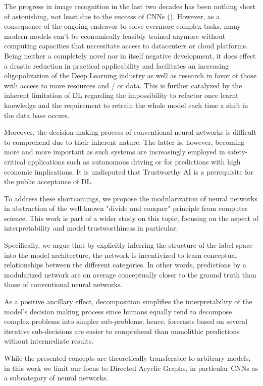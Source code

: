 \documentclass[conference]{IEEEtran}
\begin{document}
The progress in image recognition in the last two decades has been nothing short of astonishing, not least due to the success of CNNs (\cite{Alom2018-yo}). However, as a consequence of the ongoing endeavor to solve evermore complex tasks, many modern models can't be economically feasibly trained anymore without computing capacities that necessitate access to datacenters or cloud platforms. Being neither a completely novel nor in itself negative development, it does effect a drastic reduction in practical applicability and facilitates an increasing oligopolization of the Deep Learning industry as well as research in favor of those with access to more resources and / or data. This is further catalyzed by the inherent limitation of DL regarding the impossibility to refactor once learnt knowledge and the requirement to retrain the whole model each time a shift in the data base occurs.

Moreover, the decision-making process of conventional neural networks is difficult to comprehend due to their inherent nature. The latter is, however, becoming more and more important as such systems are increasingly employed in safety-critical applications such as autonomous driving or for predictions with high economic implications. It is undisputed that Trustworthy AI is a prerequisite for the public acceptance of DL.

To address these shortcomings, we propose the modularization of neural networks in abstraction of the well-known "divide and conquer" principle from computer science. This work is part of a wider study on this topic, focusing on the aspect of interpretability and model trustworthiness in particular.

Specifically, we argue that by explicitly inferring the structure of the label space into the model architecture, the network is incentivized to learn conceptual relationships between the different categories. In other words, predictions by a modularized network are on average conceptually closer to the ground truth than those of conventional neural networks.

As a positive ancillary effect, decomposition simplifies the interpretability of the model's decision making process since humans equally tend to decompose complex problems into simpler sub-problems; hence, forecasts based on several iterative sub-decisions are easier to comprehend than monolithic predictions without intermediate results.

While the presented concepts are theoretically transferable to arbitrary models, in this work we limit our focus to Directed Acyclic Graphs, in particular CNNs as a subcategory of neural networks.
\end{document}
